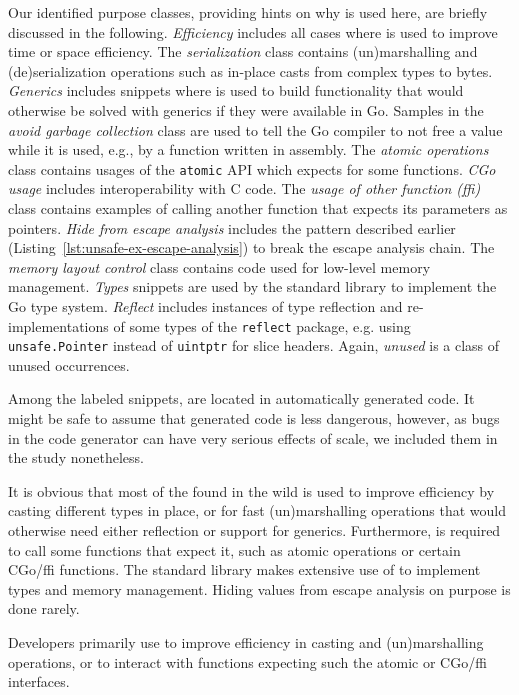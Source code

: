 Our identified purpose classes, providing hints on why \unsafe{} is used here, are briefly discussed in the following.
\textit{Efficiency} includes all cases where \unsafe{} is used to improve time or space efficiency.
The \textit{serialization} class contains (un)marshalling and (de)serialization operations such as in-place casts from complex types to bytes.
\textit{Generics} includes snippets where \unsafe{} is used to build functionality that would otherwise be solved with generics if they were available in Go.
Samples in the \textit{avoid garbage collection} class are used to tell the Go compiler to not free a value while it is used, e.g., by a function written in assembly.
The \textit{atomic operations} class contains usages of the \texttt{atomic} API which expects \unsafe{} for some functions.
\textit{CGo usage} includes interoperability with C code.
The \textit{usage of other function (ffi)} class contains examples of calling another function that expects its parameters as \unsafe{} pointers.
\textit{Hide from escape analysis} includes the pattern described earlier (Listing~\ref{lst:unsafe-ex-escape-analysis}) to break the escape analysis chain.
The \textit{memory layout control} class contains code used for low-level memory management.
\textit{Types} snippets are used by the standard library to implement the Go type system.
\textit{Reflect} includes instances of type reflection and re-implementations of some types of the \texttt{reflect} package, e.g. using \texttt{unsafe.Pointer} instead of \texttt{uintptr} for slice headers.
Again, \textit{unused} is a class of unused occurrences.

Among the  labeled snippets,  are located in automatically generated code.
It might be safe to assume that generated code is less dangerous, however, as bugs in the code generator can have very serious effects of scale, we included them in the study nonetheless.

It is obvious that most of the \unsafe{} found in the wild is used to improve efficiency by casting different types in place, or for fast (un)marshalling operations that would otherwise need either reflection or support for generics.
Furthermore, \unsafe{} is required to call some functions that expect it, such as atomic operations or certain CGo/ffi functions.
The standard library makes extensive use of \unsafe{} to implement types and memory management.
Hiding values from escape analysis on purpose is done rarely.

\begin{tcolorbox}[boxsep=1pt, enlarge top by=5pt, title=Answer to \ref{rq:purpose}]
Developers primarily use \unsafe{} to improve efficiency in casting and (un)marshalling operations, or to interact with functions expecting \unsafe{} such the atomic or CGo/ffi interfaces.
\end{tcolorbox}
